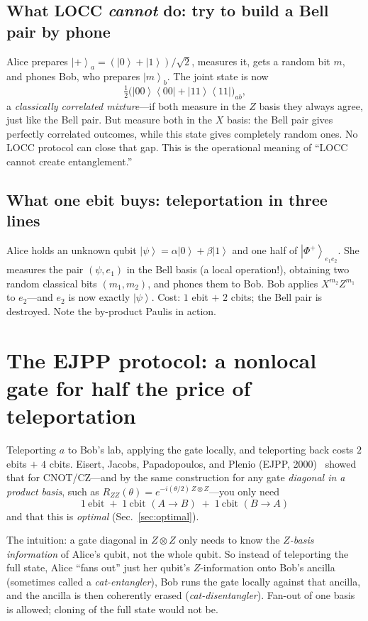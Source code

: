 \documentclass[11pt]{article}
\newcommand{\ket}[1]{\left|#1\right\rangle}
\newcommand{\bra}[1]{\left\langle#1\right|}
\newcommand{\Phip}{\ket{\Phi^{+}}}
\newcommand{\RZZ}{R_{ZZ}}
\begin{document}
\subsection{What LOCC \emph{cannot} do: try to build a Bell pair by phone}

Alice prepares $\ket{+}_a = (\ket{0}+\ket{1})/\sqrt{2}$, measures it, gets a
random bit $m$, and phones Bob, who prepares $\ket{m}_b$. The joint state is
now
\[
\tfrac{1}{2}\big(\ket{00}\bra{00} + \ket{11}\bra{11}\big)_{ab},
\]
a \emph{classically correlated mixture}---if both measure in the $Z$ basis
they always agree, just like the Bell pair. But measure both in the $X$
basis: the Bell pair gives perfectly correlated outcomes, while this state
gives completely random ones. No LOCC protocol can close that gap. This is
the operational meaning of ``LOCC cannot create entanglement.''

\subsection{What one ebit buys: teleportation in three lines}

Alice holds an unknown qubit $\ket{\psi} = \alpha\ket{0}+\beta\ket{1}$ and
one half of $\Phip_{e_1 e_2}$. She measures the pair $(\psi, e_1)$ in the
Bell basis (a local operation!), obtaining two random classical bits
$(m_1, m_2)$, and phones them to Bob. Bob applies $X^{m_2} Z^{m_1}$ to
$e_2$---and $e_2$ is now exactly $\ket{\psi}$. Cost:
$1$ ebit $+$ $2$ cbits; the Bell pair is destroyed. Note the by-product
Paulis in action.

\section{The EJPP protocol: a nonlocal gate for half the price of
teleportation}
\label{sec:ejpp}

Teleporting $a$ to Bob's lab, applying the gate locally, and teleporting back
costs $2$ ebits $+$ $4$ cbits. Eisert, Jacobs, Papadopoulos, and Plenio
(EJPP, 2000)~\cite{eisert2000} showed that for CNOT/CZ---and by the same
construction for any gate \emph{diagonal in a product basis}, such as
$\RZZ(\theta) = e^{-i(\theta/2)\,Z\otimes Z}$---you only need
\[
\boxed{\,1\ \text{ebit} \;+\; 1\ \text{cbit } (A\!\to\!B)
\;+\; 1\ \text{cbit } (B\!\to\!A)\,}
\]
and that this is \emph{optimal} (Sec.~\ref{sec:optimal}).

The intuition: a gate diagonal in $Z\otimes Z$ only needs to know the
\emph{$Z$-basis information} of Alice's qubit, not the whole qubit. So
instead of teleporting the full state, Alice ``fans out'' just her qubit's
$Z$-information onto Bob's ancilla (sometimes called a \emph{cat-entangler}),
Bob runs the gate locally against that ancilla, and the ancilla is then
coherently erased (\emph{cat-disentangler}). Fan-out of one basis is allowed;
cloning of the full state would not be.
\end{document}
